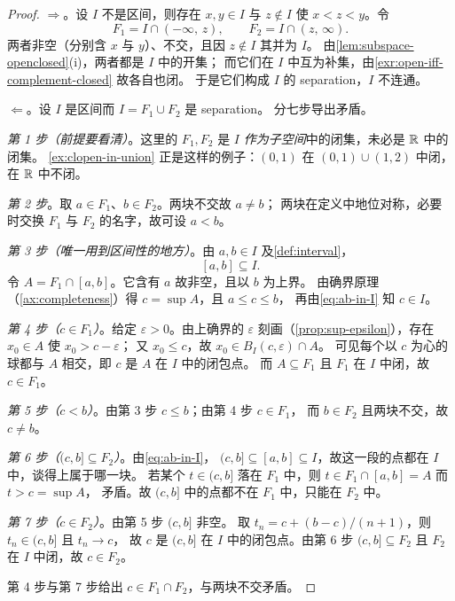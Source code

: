\begin{proof}
  \emph{\(\Rightarrow\)}。设 \(I\) 不是区间，则存在 \(x,y \in I\) 与 \(z \notin I\)
  使 \(x<z<y\)。令
  \[
    F_{1} = I \cap (-\infty,\,z), \qquad F_{2} = I \cap (z,\,\infty) .
  \]
  两者非空（分别含 \(x\) 与 \(y\)）、不交，且因 \(z \notin I\) 其并为 \(I\)。
  由\cref{lem:subspace-openclosed}(i)，两者都是 \(I\) 中的开集；
  而它们在 \(I\) 中互为补集，由\cref{exr:open-iff-complement-closed} 故各自也闭。
  于是它们构成 \(I\) 的 separation，\(I\) 不连通。

  \emph{\(\Leftarrow\)}。设 \(I\) 是区间而 \(I = F_{1} \cup F_{2}\) 是 separation。
  分七步导出矛盾。

  \emph{第 1 步（前提要看清）}。这里的 \(F_{1},F_{2}\) 是 \(I\)
  \emph{作为子空间}中的闭集，未必是 \(\mathbb{R}\) 中的闭集。
  \cref{ex:clopen-in-union} 正是这样的例子：\((0,1)\) 在 \((0,1)\cup(1,2)\) 中闭，
  在 \(\mathbb{R}\) 中不闭。

  \emph{第 2 步}。取 \(a \in F_{1}\)、\(b \in F_{2}\)。两块不交故 \(a \neq b\)；
  两块在定义中地位对称，必要时交换 \(F_{1}\) 与 \(F_{2}\) 的名字，故可设 \(a<b\)。

  \emph{第 3 步（唯一用到区间性的地方）}。由 \(a,b \in I\) 及\cref{def:interval}，
  \begin{equation}
    \label{eq:ab-in-I}
    [a,b] \subseteq I .
  \end{equation}
  令 \(A = F_{1} \cap [a,b]\)。它含有 \(a\) 故非空，且以 \(b\) 为上界。
  由确界原理（\cref{ax:completeness}）得 \(c = \sup A\)，且 \(a \le c \le b\)，
  再由\cref{eq:ab-in-I} 知 \(c \in I\)。

  \emph{第 4 步（\(c \in F_{1}\)）}。给定 \(\varepsilon>0\)。由上确界的 \(\varepsilon\)
  刻画（\cref{prop:sup-epsilon}），存在 \(x_{0} \in A\) 使 \(x_{0} > c-\varepsilon\)；
  又 \(x_{0} \le c\)，故 \(x_{0} \in B_{I}(c,\varepsilon) \cap A\)。
  可见每个以 \(c\) 为心的球都与 \(A\) 相交，即 \(c\) 是 \(A\) 在 \(I\) 中的闭包点。
  而 \(A \subseteq F_{1}\) 且 \(F_{1}\) 在 \(I\) 中闭，故 \(c \in F_{1}\)。

  \emph{第 5 步（\(c<b\)）}。由第 3 步 \(c \le b\)；由第 4 步 \(c \in F_{1}\)，
  而 \(b \in F_{2}\) 且两块不交，故 \(c \neq b\)。

  \emph{第 6 步（\((c,b] \subseteq F_{2}\)）}。由\cref{eq:ab-in-I}，
  \((c,b] \subseteq [a,b] \subseteq I\)，故这一段的点都在 \(I\) 中，谈得上属于哪一块。
  若某个 \(t \in (c,b]\) 落在 \(F_{1}\) 中，则 \(t \in F_{1} \cap [a,b] = A\) 而 \(t>c=\sup A\)，
  矛盾。故 \((c,b]\) 中的点都不在 \(F_{1}\) 中，只能在 \(F_{2}\) 中。

  \emph{第 7 步（\(c \in F_{2}\)）}。由第 5 步 \((c,b]\) 非空。
  取 \(t_{n} = c + (b-c)/(n+1)\)，则 \(t_{n} \in (c,b]\) 且 \(t_{n} \to c\)，
  故 \(c\) 是 \((c,b]\) 在 \(I\) 中的闭包点。由第 6 步 \((c,b] \subseteq F_{2}\)
  且 \(F_{2}\) 在 \(I\) 中闭，故 \(c \in F_{2}\)。

  第 4 步与第 7 步给出 \(c \in F_{1} \cap F_{2}\)，与两块不交矛盾。
\end{proof}

